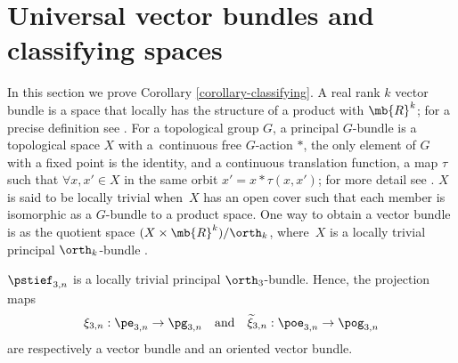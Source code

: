 \section{Universal vector bundles and classifying spaces}\label{section-bundles}

In this section we prove Corollary \ref{corollary-classifying}.
A real rank $k$ vector bundle is a space that locally has the structure of a product with $\mb{R}^k$;
for a precise definition see \hbox{\cite[p.\,24]{husemoller1994fibre}}.
For a topological group $G$, a principal $G$-bundle is a topological space $X$ with a~continuous free $G$-action $*$, \ie the only element of $G$ with a fixed point is the identity,
and a continuous translation function, \ie a map $\tau$ such that $\forall x,x' \in X$ in the same orbit $x' = x*\tau(x,x')$; for more detail see \cite[p.\,42]{husemoller1994fibre}.
$X$ is said to be locally trivial when~$X$ has an open cover such that each member is isomorphic as a $G$-bundle to a product space.
One way to obtain a vector bundle is as the quotient space $(X \times \mb{R}^k)/\orth_k$, where~$X$ is a locally trivial principal $\orth_k$-bundle \cite[Chap.\,5]{husemoller1994fibre}.

\begin{lemma}\label{lemma-principal-bundle}
$\pstief_{3,n}$ is a locally trivial principal $\orth_3$-bundle.
Hence, the projection maps
$$ \xi_{3,n}: \pe_{3,n} \to \pg_{3,n} \quad \text{and} \quad \widetilde\xi_{3,n}: \poe_{3,n} \to \pog_{3,n} $$
are respectively a vector bundle and an oriented vector bundle. \end{lemma}

